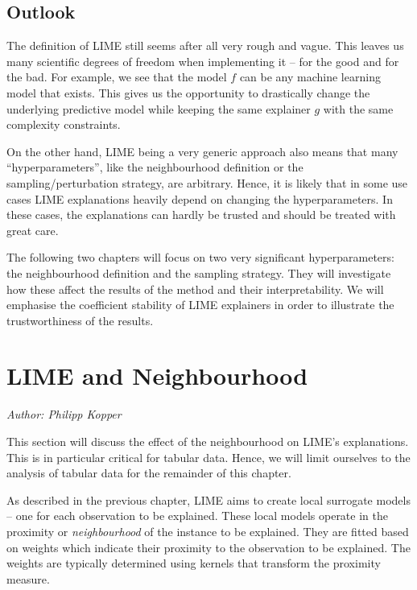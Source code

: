 \documentclass[
]{krantz}
\begin{document}
\hypertarget{outlook-1}{%
\section{Outlook}\label{outlook-1}}

The definition of LIME still seems after all very rough and vague.
This leaves us many scientific degrees of freedom when implementing it -- for the good and for the bad.
For example, we see that the model \(f\) can be any machine learning model that exists.
This gives us the opportunity to drastically change the underlying predictive model while keeping the same explainer \(g\) with the same complexity constraints.

On the other hand, LIME being a very generic approach also means that many ``hyperparameters'', like the neighbourhood definition or the sampling/perturbation strategy, are arbitrary.
Hence, it is likely that in some use cases LIME explanations heavily depend on changing the hyperparameters.
In these cases, the explanations can hardly be trusted and should be treated with great care.

The following two chapters will focus on two very significant hyperparameters:
the neighbourhood definition and the sampling strategy.
They will investigate how these affect the results of the method and their interpretability.
We will emphasise the coefficient stability of LIME explainers in order to illustrate the trustworthiness of the results.

\hypertarget{id1}{%
\chapter{LIME and Neighbourhood}\label{id1}}

\emph{Author: Philipp Kopper}

This section will discuss the effect of the neighbourhood on LIME's explanations.
This is in particular critical for tabular data.
Hence, we will limit ourselves to the analysis of tabular data for the remainder of this chapter.

As described in the previous chapter, LIME aims to create local surrogate models -- one for each observation to be explained.
These local models operate in the proximity or \emph{neighbourhood} of the instance to be explained.
They are fitted based on weights which indicate their proximity to the observation to be explained.
The weights are typically determined using kernels that transform the proximity measure.
\end{document}
